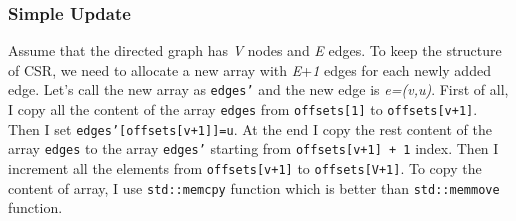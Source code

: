\documentclass{article}
\begin{document}
 \subsubsection*{Simple Update}
   Assume that the directed graph has \textit{V} nodes and \textit{E} edges. To keep the structure of CSR, we need to allocate a new array with \textit{E}+\textit{1} edges for each newly added edge. Let's call the new array as \texttt{edges'} and the new edge is \textit{e=(v,u)}. First of all, I copy all the content of the array \texttt{edges} from \texttt{offsets[1]} to \texttt{offsets[v+1]}. Then I set \texttt{edges'[offsets[v+1]]=u}. At the end I copy the rest content of the array \texttt{edges} to the array \texttt{edges'} starting from \texttt{offsets[v+1] + 1} index. Then I increment all the elements from \texttt{offsets[v+1]} to \texttt{offsets[V+1]}. To copy the content of array, I use \texttt{std::memcpy} function which is better than \texttt{std::memmove} function. 
\end{document}
